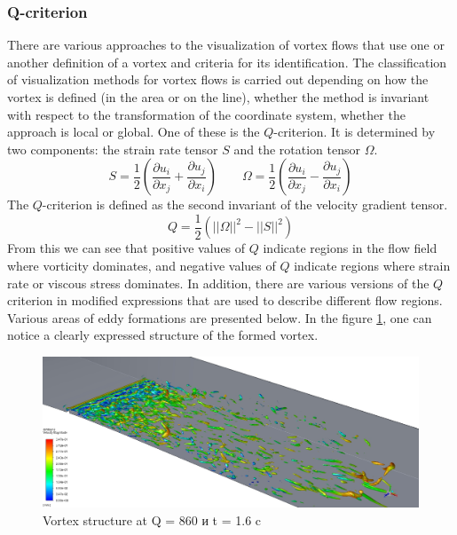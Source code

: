 \subsubsection{Q-criterion}
	There are various approaches to the visualization of vortex flows that use one or another definition of a vortex and criteria for its identification. The classification of visualization methods for vortex flows is carried out depending on how the vortex is defined (in the area or on the line), whether the method is invariant with respect to the transformation of the coordinate system, whether the approach is local or global\cite{Hunt1988}. One of these is the $Q$-criterion. It is determined by two components: the strain rate tensor $S$ and the rotation tensor $\Omega$.
	\begin{equation}
		S = \frac{1}{2}(\frac{\partial u_i}{\partial x_j} + \frac{\partial u_j}{\partial x_i}) \qquad \Omega = \frac{1}{2}(\frac{\partial u_i}{\partial x_j} - \frac{\partial u_j}{\partial x_i})
	\end{equation}
	The $Q$-criterion is defined as the second invariant of the velocity gradient tensor\cite{Wiebel2007}.
	\begin{equation}
		Q = \frac{1}{2}(||\Omega||^2 - ||S||^2)
	\end{equation}
	From this we can see that positive values of $Q$ indicate regions in the flow field where vorticity dominates, and negative values of $Q$ indicate regions where strain rate or viscous stress dominates. In addition, there are various versions of the $Q$ criterion in modified expressions that are used to describe different flow regions\cite{Berdahl1993,Chong1990}.
	\newpage
	Various areas of eddy formations are presented below. In the figure \ref{fig:q860-t16}, one can notice a clearly expressed structure of the formed vortex.
	\begin{figure}[H]
		\centering
		\includegraphics[width=1\linewidth]{../Assets/Q860-t16}
		\caption{Vortex structure at Q = 860 и t = 1.6 c}
		\label{fig:q860-t16}
	\end{figure}
